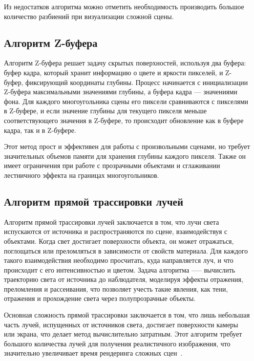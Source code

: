 Из недостатков алгоритма можно отметить необходимость производить большое количество разбиений при визуализации сложной сцены.


\subsection{Алгоритм Z-буфера}
Алгоритм Z-буфера решает задачу скрытых поверхностей, используя два буфера: буфер кадра, который хранит информацию о цвете и яркости пикселей, и Z-буфер, фиксирующий координаты глубины. Процесс начинается с инициализации Z-буфера максимальными значениями глубины, а буфера кадра --- значениями фона. Для каждого многоугольника сцены его пиксели сравниваются с пикселями в Z-буфере, и если значение глубины для текущего пикселя меньше соответствующего значения в Z-буфере, то происходит обновление как в буфере кадра, так и в Z-буфере.

Этот метод прост и эффективен для работы с произвольными сценами, но требует значительных объемов памяти для хранения глубины каждого пикселя. Также он имеет ограничения при работе с прозрачными объектами и сглаживании лестничного эффекта на границах многоугольников.

\subsection{Алгоритм прямой трассировки лучей}
Алгоритм прямой трассировки лучей заключается в том, что лучи света испускаются от источника и распространяются по сцене, взаимодействуя с объектами. Когда свет достигает поверхности объекта, он может отражаться, поглощаться или преломляться в зависимости от свойств материала. Для каждого такого взаимодействия необходимо просчитать, куда направляется луч, и что происходит с его интенсивностью и цветом. Задача алгоритма —-- вычислить траекторию света от источника до наблюдателя, моделируя эффекты отражения, преломления и рассеивания, что позволяет учесть такие явления, как тени, отражения и прохождение света через полупрозрачные объекты.

Основная сложность прямой трассировки заключается в том, что лишь небольшая часть лучей, испущенных от источников света, достигает поверхности камеры или экрана, что делает метод вычислительно затратным. Этот алгоритм требует большого количества лучей для получения реалистичного изображения, что значительно увеличивает время рендеринга сложных сцен~\cite{ray_tracing}.

